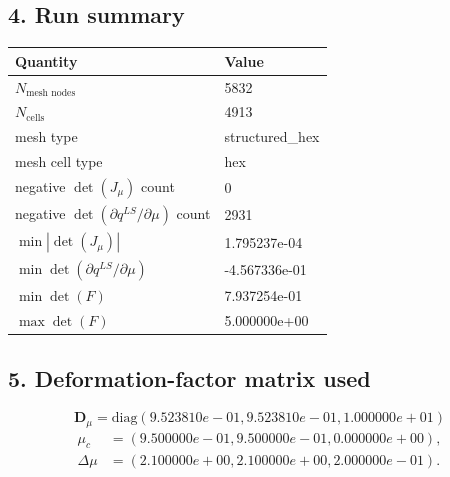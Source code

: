 \documentclass[11pt]{article}
\begin{document}
\subsection*{4. Run summary}
\begin{center}
\begin{tabular}{ll}
\toprule
Quantity & Value \\
\midrule
$N_\text{mesh nodes}$ & 5832 \\
$N_\text{cells}$ & 4913 \\
mesh type & structured_hex \\
mesh cell type & hex \\
negative $\det(J_\mu)$ count & 0 \\
negative $\det(\partial q^{LS}/\partial\mu)$ count & 2931 \\
$\min |\det(J_\mu)|$ & 1.795237e-04 \\
$\min\det(\partial q^{LS}/\partial\mu)$ & -4.567336e-01 \\
$\min\det(F)$ & 7.937254e-01 \\
$\max\det(F)$ & 5.000000e+00 \\
\bottomrule
\end{tabular}
\end{center}
\subsection*{5. Deformation-factor matrix used}
\begin{equation}
\mathbf{D}_{\mu}=\mathrm{diag}\left(9.523810e-01,9.523810e-01,1.000000e+01\right)\end{equation}
\begin{align}
\mu_c &= \left(9.500000e-01,9.500000e-01,0.000000e+00\right),\\
\Delta\mu &= \left(2.100000e+00,2.100000e+00,2.000000e-01\right).
\end{align}
\end{document}
